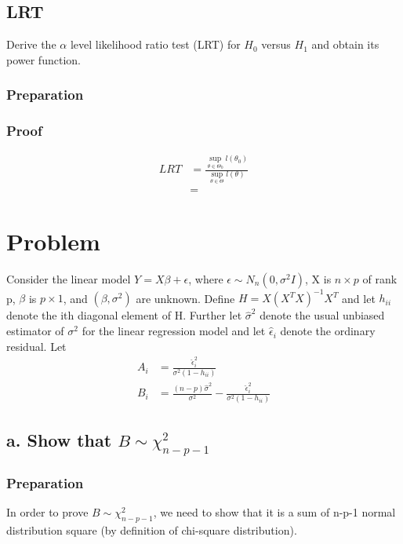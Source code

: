 \documentclass[11pt]{article} %
\begin{document}
\subsection{LRT }

Derive the $\alpha$ level likelihood ratio test (LRT) for $H_0$ versus $H_1$ and obtain its power function.


\subsubsection{Preparation}


\subsubsection{Proof}

\begin{align*}
	LRT &= \frac{\underset{\theta \in \Theta_0}{\sup} l(\theta_0)}{\underset{\theta \in \Theta}{\sup} l(\theta)} \\
	&= 
\end{align*}




\section{Problem }
Consider the linear model $Y = X \beta + \epsilon$, where $\epsilon \sim N_n(0, \sigma^2 I)$, X is $n \times p$ of rank p, $\beta$ is $p \times 1$, and $(\beta, \sigma^2)$ are unknown. Define $H = X(X^TX)^{-1}X^T$ and let $h_{ii}$ denote the ith diagonal element of H. Further let $\hat{\sigma}^2$ denote the usual unbiased estimator of $\sigma^2$ for the linear regression model and let $\hat{\epsilon}_i$ denote the ordinary residual. Let 
\begin{align*}
	A_i & = \frac{\hat{\epsilon}_i^2}{\sigma^2(1-h_{ii})} \\
	B_i & = \frac{(n-p)\hat{\sigma}^2 }{\sigma^2} - \frac{\hat{\epsilon}_i^2}{\sigma^2(1-h_{ii})}
\end{align*}

\subsection{a. Show that $B \sim \chi^2_{n-p-1}$}

\subsubsection{Preparation}
In order to prove $B \sim \chi^2_{n-p-1}$, we need to show that it is a sum of n-p-1 normal distribution square (by definition of chi-square distribution). 
\end{document}
